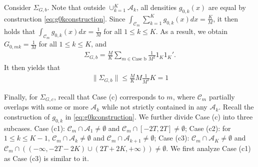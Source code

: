 \documentclass[preprint,11pt]{article}
\newcommand{\mcal}{\mathcal}
\numberwithin{equation}{section}
\begin{document}
Consider $\Sigma_{G,b}$. Note that outside $\cup_{k=1}^K\mcal{A}_k$, all densities $g_{0,k}(x)$ are equal by construction \eqref{eq:g0kconstruction}. Since $\int_{\mcal{C}_m}\sum_{k=1}^Kg_{0,k}(x)dx=\frac{K}{M}$, it then holds that $\int_{\mcal{C}_m}g_{0,k}(x)dx=\frac{1}{M}$ for all $1\le k\le K$. As a result, we obtain $G_{0,mk}=\frac{1}{M}$ for all $1\le k\le K$, and
\begin{align*}
    \Sigma_{G,b} = \frac{M}{K}\sum_{m\in \text{Case b}}\frac{1}{M^2}1_K1_K'.
\end{align*}
It then yields that
\begin{align*}
    \|\Sigma_{G,b}\|\le \frac{M}{K}M\frac{1}{M^2}K=1
\end{align*}

Finally, for $\Sigma_{G,c}$, recall that Case (c) corresponds to $m$, where $\mcal{C}_m$ partially overlaps with some or more $\mcal{A}_k$ while not strictly contained in any $\mcal{A}_k$. Recall the construction of $g_{0,k}$ in \eqref{eq:g0kconstruction}. We further divide Case (c) into three subcases. Case (c1): $\mcal{C}_m\cap \mcal{A}_1\neq \emptyset$ and $\mcal{C}_m\cap[-2T,2T]\neq\emptyset$; Case (c2): for $1\le k\le K-1$, $\mcal{C}_m\cap\mcal{A}_{k}\neq\emptyset$ and $\mcal{C}_m\cap\mcal{A}_{k+1}\neq\emptyset$; Case (c3): $\mcal{C}_m\cap \mcal{A}_K\neq\emptyset$ and $\mcal{C}_m\cap \left((-\infty,-2T-2K)\cup(2T+2K,+\infty)\right)\neq\emptyset$. We first analyze Case (c1) as Case (c3) is similar to it. 
\end{document}
